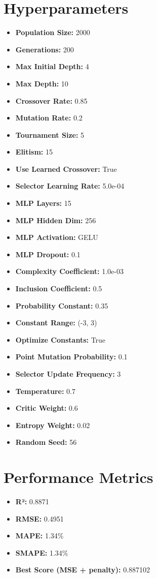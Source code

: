 \documentclass{article}
\begin{document}
\section*{Hyperparameters}
\begin{itemize}
\item \textbf{Population Size:} 2000
\item \textbf{Generations:} 200
\item \textbf{Max Initial Depth:} 4
\item \textbf{Max Depth:} 10
\item \textbf{Crossover Rate:} 0.85
\item \textbf{Mutation Rate:} 0.2
\item \textbf{Tournament Size:} 5
\item \textbf{Elitism:} 15
\item \textbf{Use Learned Crossover:} True
\item \textbf{Selector Learning Rate:} 5.0e-04
\item \textbf{MLP Layers:} 15
\item \textbf{MLP Hidden Dim:} 256
\item \textbf{MLP Activation:} GELU
\item \textbf{MLP Dropout:} 0.1
\item \textbf{Complexity Coefficient:} 1.0e-03
\item \textbf{Inclusion Coefficient:} 0.5
\item \textbf{Probability Constant:} 0.35
\item \textbf{Constant Range:} (-3, 3)
\item \textbf{Optimize Constants:} True
\item \textbf{Point Mutation Probability:} 0.1
\item \textbf{Selector Update Frequency:} 3
\item \textbf{Temperature:} 0.7
\item \textbf{Critic Weight:} 0.6
\item \textbf{Entropy Weight:} 0.02
\item \textbf{Random Seed:} 56
\end{itemize}
\section*{Performance Metrics}
\begin{itemize}
\item \textbf{R²:} 0.8871
\item \textbf{RMSE:} 0.4951
\item \textbf{MAPE:} 1.34\%
\item \textbf{SMAPE:} 1.34\%
\item \textbf{Best Score (MSE + penalty):} 0.887102
\end{itemize}
\end{document}
